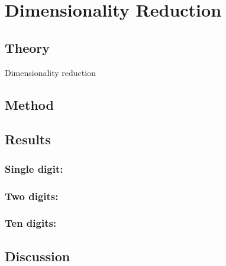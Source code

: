 \chapter{Dimensionality Reduction}
\section{Theory}
Dimensionality reduction  

\section{Method}

\section{Results}

\subsection{Single digit:}

\subsection{Two digits:}

\subsection{Ten digits:}

\section{Discussion}

